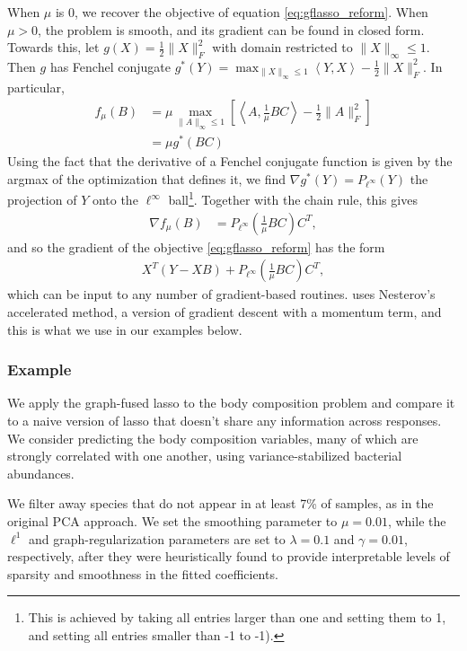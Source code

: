 \documentclass{article}
\begin{document}
When $\mu$ is 0, we recover the objective of equation \ref{eq:gflasso_reform}.
When $\mu > 0$, the problem is smooth, and its gradient can be found in closed
form. Towards this, let $g\left(X\right) = \frac{1}{2}\|X\|_{F}^{2}$ with domain
restricted to $\|X\|_{\infty} \leq 1$. Then $g$ has Fenchel conjugate
$g^{\ast}\left(Y\right) = \max_{\|X\|_{\infty}\leq 1}\left<Y, X\right> -
\frac{1}{2}\|X\|_{F}^{2}$. In particular,
\begin{align*}
f_{\mu}\left(B\right) &=  \mu \max_{\|A\|_{\infty} \leq 1}
\left[\left<A, \frac{1}{\mu}BC\right> - \frac{1}{2}\|A\|_{F}^{2}\right] \\
&= \mu g^{\ast}\left(BC\right)
\end{align*}
Using the fact that the derivative of a Fenchel conjugate function is given by
the argmax of the optimization that defines it, we find $\nabla
g^{\ast}\left(Y\right) = P_{\ell^{\infty}}\left(Y\right)$ the projection of $Y$
onto the $\ell^{\infty}$ ball\footnote{This is achieved by taking all entries
  larger than one and setting them to 1, and setting all entries smaller than -1
  to -1).}. Together with the chain rule, this gives
\begin{align*}
  \nabla f_{\mu}\left(B\right) &= P_{\ell^{\infty}}\left(\frac{1}{\mu}BC\right)C^{T},
\end{align*}
and so the gradient of the objective \ref{eq:gflasso_reform} has the form
\begin{align*}
 X^{T}\left(Y - XB\right) + P_{\ell^{\infty}}\left(\frac{1}{\mu}BC\right)C^{T},
\end{align*}
which can be input to any number of gradient-based routines.
\cite{chen2010graph} uses Nesterov's accelerated method, a version of gradient
descent with a momentum term, and this is what we use in our examples below.

\subsubsection{Example}
\label{subsubsec:graph_fused_example}

We apply the graph-fused lasso to the body composition problem and compare it to
a naive version of lasso that doesn't share any information across responses. We
consider predicting the body composition variables, many of which are strongly
correlated with one another, using variance-stabilized bacterial abundances.

We filter away species that do not appear in at least 7\% of samples, as in the
original PCA approach. We set the smoothing parameter to $\mu = 0.01$, while the
$\ell^{1}$ and graph-regularization parameters are set to $\lambda = 0.1$ and
$\gamma = 0.01$, respectively, after they were heuristically found to provide
interpretable levels of sparsity and smoothness in the fitted coefficients.
\end{document}
